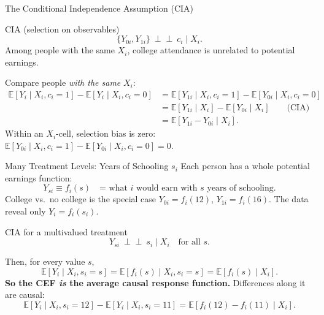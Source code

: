 \documentclass[aspectratio=169,11pt]{beamer}
\newcommand{\E}{\mathbb{E}}
\newcommand{\indep}{\perp\!\!\!\perp}
\begin{document}
\begin{frame}{The Conditional Independence Assumption (CIA)}
\small
\begin{block}{CIA (selection on observables)}
\[
\{Y_{0i},Y_{1i}\}\ \indep\ c_i \mid X_i .
\tag{3.2.2}
\]
Among people with the same $X_i$, college attendance is unrelated to potential earnings.
\end{block}
\medskip
Compare people \emph{with the same} $X_i$:
\[
\begin{aligned}
\E[Y_i\mid X_i,c_i=1]-\E[Y_i\mid X_i,c_i=0]
&=\E[Y_{1i}\mid X_i,c_i=1]-\E[Y_{0i}\mid X_i,c_i=0]\\
&=\E[Y_{1i}\mid X_i]-\E[Y_{0i}\mid X_i] \qquad\text{(CIA)}\\
&=\boxed{\E[Y_{1i}-Y_{0i}\mid X_i].}
\end{aligned}
\]
Within an $X_i$-cell, selection bias is zero:
$\E[Y_{0i}\mid X_i,c_i=1]-\E[Y_{0i}\mid X_i,c_i=0]=0$.
\end{frame}

\begin{frame}{Many Treatment Levels: Years of Schooling $s_i$}
\small
Each person has a whole \alert{potential earnings function}:
\[
Y_{si}\equiv f_i(s)\quad\text{= what $i$ would earn with $s$ years of schooling.}
\]
College vs.\ no college is the special case $Y_{0i}=f_i(12)$, $Y_{1i}=f_i(16)$. The data reveal only $Y_i=f_i(s_i)$.
\begin{block}{CIA for a multivalued treatment}
\[
Y_{si}\ \indep\ s_i\mid X_i \quad\text{for all } s.
\]
\end{block}
Then, for every value $s$,
\[
\E[Y_i\mid X_i,s_i=s]=\E[f_i(s)\mid X_i,s_i=s]=\boxed{\E[f_i(s)\mid X_i].}
\]
\textbf{So the CEF \emph{is} the average causal response function.} Differences along it are causal:
\[
\E[Y_i\mid X_i,s_i=12]-\E[Y_i\mid X_i,s_i=11]=\E[f_i(12)-f_i(11)\mid X_i].
\]
\end{frame}
\end{document}
